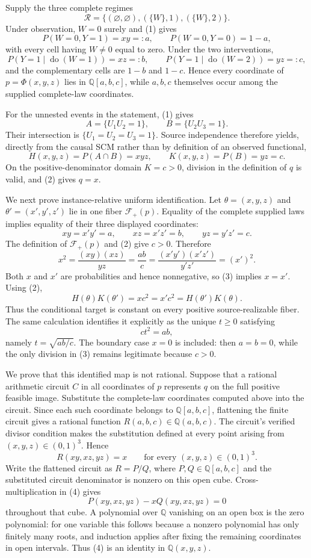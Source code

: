 Supply the three complete regimes
\[
 \mathcal R=\bigl\{(\varnothing,\varnothing),
 (\{W\},1),(\{W\},2)\bigr\}.
\]
Under observation, \(W=0\) surely and (1) gives
\[
 P(W=0,Y=1)=xy=:a,
 \qquad P(W=0,Y=0)=1-a,
\]
with every cell having \(W\neq0\) equal to zero.  Under the two interventions,
\[
 P(Y=1\mid\operatorname{do}(W=1))=xz=:b,
 \qquad
 P(Y=1\mid\operatorname{do}(W=2))=yz=:c,
\]
and the complementary cells are \(1-b\) and \(1-c\).  Hence every coordinate of \(p=\Phi(x,y,z)\) lies in \(\mathbb Q[a,b,c]\), while \(a,b,c\) themselves occur among the supplied complete-law coordinates.

For the unnested events in the statement, (1) gives
\[
 A=\{U_1U_2=1\},\qquad B=\{U_2U_3=1\}.
\]
Their intersection is \(\{U_1=U_2=U_3=1\}\).  Source independence therefore yields, directly from the causal SCM rather than by definition of an observed functional,
\[
 H(x,y,z)=P(A\cap B)=xyz,
 \qquad
 K(x,y,z)=P(B)=yz=c.
 \tag{2}
\]
On the positive-denominator domain \(K=c>0\), division in the definition of \(q\) is valid, and (2) gives \(q=x\).

We next prove instance-relative uniform identification.  Let \(\theta=(x,y,z)\) and \(\theta'=(x',y',z')\) lie in one fiber \(\mathcal F_+(p)\).  Equality of the complete supplied laws implies equality of their three displayed coordinates:
\[
 xy=x'y'=a,\qquad xz=x'z'=b,
 \qquad yz=y'z'=c.
\]
The definition of \(\mathcal F_+(p)\) and (2) give \(c>0\).  Therefore
\[
 x^2=\frac{(xy)(xz)}{yz}=\frac{ab}{c}
 =\frac{(x'y')(x'z')}{y'z'}=(x')^2.
 \tag{3}
\]
Both \(x\) and \(x'\) are probabilities and hence nonnegative, so (3) implies \(x=x'\).  Using (2),
\[
 H(\theta)K(\theta')=x c^2=x'c^2
 =H(\theta')K(\theta).
\]
Thus the conditional target is constant on every positive source-realizable fiber.  The same calculation identifies it explicitly as the unique \(t\geq0\) satisfying
\[
 c t^2=ab,
\]
namely \(t=\sqrt{ab/c}\).  The boundary case \(x=0\) is included: then \(a=b=0\), while the only division in (3) remains legitimate because \(c>0\).

We prove that this identified map is not rational.  Suppose that a rational arithmetic circuit \(C\) in all coordinates of \(p\) represents \(q\) on the full positive feasible image.  Substitute the complete-law coordinates computed above into the circuit.  Since each such coordinate belongs to \(\mathbb Q[a,b,c]\), flattening the finite circuit gives a rational function \(R(a,b,c)\in\mathbb Q(a,b,c)\).  The circuit's verified divisor condition makes the substitution defined at every point arising from \((x,y,z)\in(0,1)^3\).  Hence
\[
 R(xy,xz,yz)=x
 \qquad\text{for every }(x,y,z)\in(0,1)^3.
 \tag{4}
\]
Write the flattened circuit as \(R=P/Q\), where \(P,Q\in\mathbb Q[a,b,c]\) and the substituted circuit denominator is nonzero on this open cube.  Cross-multiplication in (4) gives
\[
 P(xy,xz,yz)-xQ(xy,xz,yz)=0
\]
throughout that cube.  A polynomial over \(\mathbb Q\) vanishing on an open box is the zero polynomial: for one variable this follows because a nonzero polynomial has only finitely many roots, and induction applies after fixing the remaining coordinates in open intervals.  Thus (4) is an identity in \(\mathbb Q(x,y,z)\).

